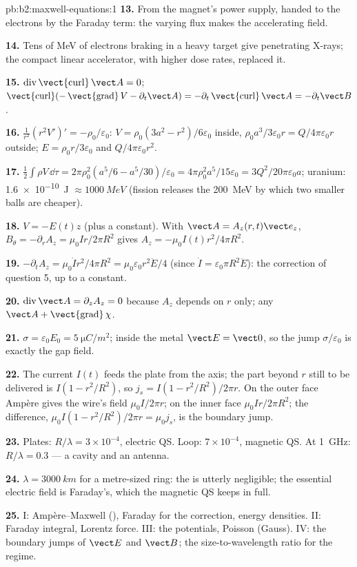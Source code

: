 \begin{solution}{pb:b2:maxwell-equations:1}
\textbf{13.} From the magnet's power supply, handed to the electrons by
the Faraday term: the varying flux makes the accelerating field.

\textbf{14.} Tens of MeV of electrons braking in a heavy target give
penetrating X-rays; the compact linear accelerator, with higher dose
rates, replaced it.

\textbf{15.} $\operatorname{div}\operatorname{\vect{curl}}\vect A = 0$; $\operatorname{\vect{curl}}(-\operatorname{\vect{grad}}
V - \partial_t\vect A) = -\partial_t\operatorname{\vect{curl}}\vect A = -\partial_t\vect B$.

\textbf{16.} $\frac1{r^2}(r^2V')' = -\rho_0/\varepsilon_0$: $V = \rho_0(3a^2 - r^2)/6\varepsilon_0$
inside, $\rho_0a^3/3\varepsilon_0r = Q/4\pi\varepsilon_0r$ outside; $E = \rho_0r/3\varepsilon_0$ and
$Q/4\pi\varepsilon_0r^2$.

\textbf{17.} $\tfrac12\int\rho V\,\dd\tau = 2\pi\rho_0^2(a^5/6 - a^5/30)/\varepsilon_0 = 4\pi\rho_0^2a^5/
15\varepsilon_0 = 3Q^2/20\pi\varepsilon_0a$; uranium: \qty{1.6e-10}{J} $\approx \qty{1000}{MeV}$ (fission
releases the \qty{200}{MeV} by which two smaller balls are cheaper).

\textbf{18.} $V = -E(t)z$ (plus a constant). With $\vect A = A_z(r, t)\vect e_z$,
$B_\theta = -\partial_rA_z = \mu_0Ir/2\pi R^2$ gives $A_z = -\mu_0I(t)r^2/4\pi R^2$.

\textbf{19.} $-\partial_tA_z = \mu_0\dot Ir^2/4\pi R^2 = \mu_0\varepsilon_0r^2\ddot E/4$ (since $\dot I =
\varepsilon_0\pi R^2\ddot E$): the correction of question 5, up to a constant.

\textbf{20.} $\operatorname{div}\vect A = \partial_zA_z = 0$ because $A_z$ depends on $r$
only; any $\vect A + \operatorname{\vect{grad}}\chi$.

\textbf{21.} $\sigma = \varepsilon_0E_0 = \qty{5}{\micro C/m^2}$; inside the metal $\vect E =
\vect 0$, so the jump $\sigma/\varepsilon_0$ is exactly the gap field.

\textbf{22.} The current $I(t)$ feeds the plate from the axis; the
part beyond $r$ still to be delivered is $I(1 - r^2/R^2)$, so $j_s = I(1 -
r^2/R^2)/2\pi r$. On the outer face Ampère gives the wire's field $\mu_0I/
2\pi r$; on the inner face $\mu_0Ir/2\pi R^2$; the difference, $\mu_0I(1 -
r^2/R^2)/2\pi r = \mu_0j_s$, is the boundary jump.

\textbf{23.} Plates: $R/\lambda = 3 \times 10^{-4}$, electric QS. Loop: $7 \times 10^{-4}$,
magnetic QS. At \qty{1}{GHz}: $R/\lambda = 0.3$ --- a cavity and an antenna.

\textbf{24.} $\lambda = \qty{3000}{km}$ for a metre-sized ring: the  is utterly negligible; the essential electric field is
Faraday's, which the magnetic QS keeps in full.

\textbf{25.} I: Ampère--Maxwell (), Faraday for
the correction, energy densities. II: Faraday integral, Lorentz force.
III: the potentials, Poisson (Gauss). IV: the boundary jumps of $\vect E$
and $\vect B$; the size-to-wavelength ratio for the regime.
\end{solution}
